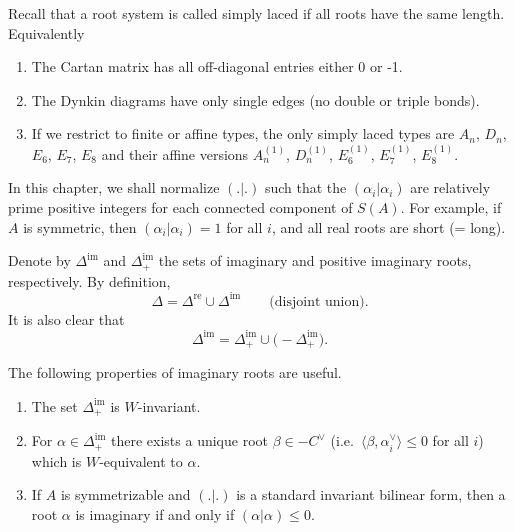 \documentclass[12pt]{article}
\begin{document}
\begin{remark}
    Recall that a root system is called simply laced if all roots have the same length. Equivalently \begin{enumerate}
        \item The Cartan matrix has all off-diagonal entries either 0 or -1. 
        \item The Dynkin diagrams have only single edges (no double or triple bonds).
        \item If we restrict to finite or affine types, the only simply laced types are $A_n$, $D_n$, $E_6$, $E_7$, $E_8$ and their affine versions $A_n^{(1)}$, $D_n^{(1)}$, $E_6^{(1)}$, $E_7^{(1)}$, $E_8^{(1)}$.
    \end{enumerate}

\end{remark}

In this chapter, we shall normalize $(.|.)$ such that the $(\alpha_i|\alpha_i)$ 
are relatively prime positive integers for each connected component of $S(A)$. 
For example, if $A$ is symmetric, then $(\alpha_i|\alpha_i)=1$ for all $i$, and 
all real roots are short (= long).

Denote by 
$\Delta^{\mathrm{im}}$ and $\Delta^{\mathrm{im}}_+$ the sets of imaginary and 
positive imaginary roots, respectively. By definition,
\[
   \Delta = \Delta^{\mathrm{re}} \cup \Delta^{\mathrm{im}}
   \qquad \text{(disjoint union).}
\]
It is also clear that
\[
   \Delta^{\mathrm{im}} = \Delta^{\mathrm{im}}_+ \cup \big(-\Delta^{\mathrm{im}}_+\big).
\]

The following properties of imaginary roots are useful.

\begin{proposition}\label{prop:imaginary-roots}
\leavevmode
\begin{enumerate}[label=\alph*)]
    \item The set $\Delta^{\mathrm{im}}_+$ is $W$-invariant.
    \item For $\alpha \in \Delta^{\mathrm{im}}_+$ there exists a unique root 
          $\beta \in -C^\vee$ (i.e.\ $\langle \beta, \alpha_i^\vee \rangle \leq 0$ 
          for all $i$) which is $W$-equivalent to $\alpha$.
    \item If $A$ is symmetrizable and $(.|.)$ is a standard invariant bilinear 
          form, then a root $\alpha$ is imaginary if and only if $(\alpha|\alpha)\leq 0$.
\end{enumerate}
\end{proposition}
\end{document}
